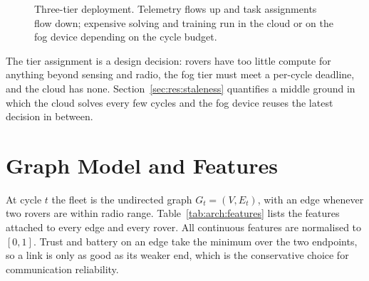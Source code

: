 \begin{figure}[htbp]
\centering
{}
\caption[Three-tier deployment.]{Three-tier deployment. Telemetry flows up and task assignments flow
down; expensive solving and training run in the cloud or on the fog device
depending on the cycle budget.}
\label{fig:arch:tiers}
\end{figure}

The tier assignment is a design decision: rovers have too little compute for
anything beyond sensing and radio, the fog tier must meet a per-cycle deadline,
and the cloud has none. Section~\ref{sec:res:staleness} quantifies a middle
ground in which the cloud solves every few cycles and the fog device reuses the
latest decision in between.

\section{Graph Model and Features}

At cycle $t$ the fleet is the undirected graph $G_t=(V,E_t)$, with an edge
whenever two rovers are within radio range. Table~\ref{tab:arch:features}
lists the features attached to every edge and every rover. All continuous
features are normalised to $[0,1]$. Trust and battery on an edge take the
minimum over the two endpoints, so a link is only as good as its weaker end,
which is the conservative choice for communication reliability.

